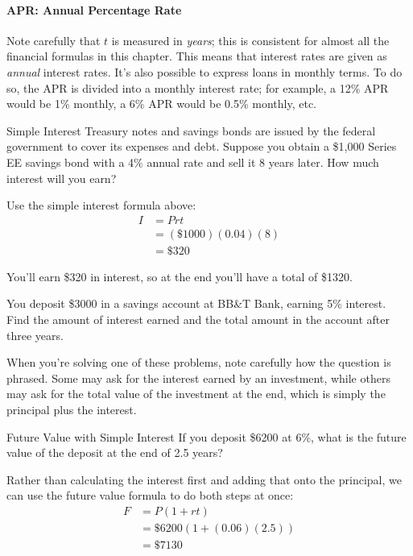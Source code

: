 \paragraph{APR: Annual Percentage Rate} Note carefully that $t$ is measured in \textit{years}; this is consistent for almost all the financial formulas in this chapter.  This means that interest rates are given as \textit{annual} interest rates.  It's also possible to express loans in monthly terms.  To do so, the APR is divided into a monthly interest rate; for example, a 12\% APR would be 1\% monthly, a 6\% APR would be 0.5\% monthly, etc.
\vfill

\begin{example}{Simple Interest}
Treasury notes and savings bonds are issued by the federal government to cover its expenses and debt.
Suppose you obtain a \$1,000 Series EE savings bond with a 4\% annual rate and sell it 8 years later. How much interest will you earn?
\vspace{0.1in}

\sol
Use the simple interest formula above:
\begin{align*}
I &= Prt\\
&= (\$1000)(0.04)(8)\\
&= \boxed{\$320}
\end{align*}

You'll earn \$320 in interest, so at the end you'll have a total of \$1320.
\end{example}
\vfill

\begin{try}
You deposit \$3000 in a savings account at BB\&T Bank, earning 5\% interest.  Find the amount of interest earned and the total amount in the account after three years.
\end{try}

\vfill
When you're solving one of these problems, note carefully how the question is phrased.  Some may ask for the interest earned by an investment, while others may ask for the total value of the investment at the end, which is simply the principal plus the interest.

\vfill
\text{}
\pagebreak
\text{}
\vfill

\begin{example}{Future Value with Simple Interest}
If you deposit \$6200 at 6\%, what is the future value of the deposit at the end of 2.5 years?

\sol
Rather than calculating the interest first and adding that onto the principal, we can use the future value formula to do both steps at once:
\begin{align*}
F &= P(1+rt)\\
&= \$6200(1+(0.06)(2.5))\\
&= \boxed{\$7130}
\end{align*}
\end{example}
\vfill


